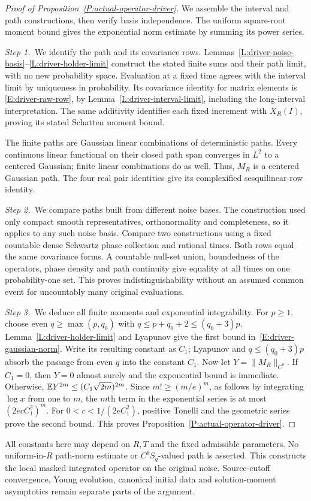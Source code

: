 \begin{proof}[Proof of Proposition~\ref{P:actual-operator-driver}]
  We assemble the interval and path constructions, then verify basis
  independence. The uniform square-root moment bound gives the exponential
  norm estimate by summing its power series.

  \medskip
  \noindent\textit{Step 1.~}We identify the path and its covariance rows.
  Lemmas~\ref{L:driver-noise-basis}--\ref{L:driver-holder-limit} construct the
  stated finite sums and their path limit, with no new probability space.
  Evaluation at a fixed time agrees with the interval limit by uniqueness in
  probability. Its covariance identity for matrix elements is
  \eqref{E:driver-raw-row}, by Lemma~\ref{L:driver-interval-limit}, including
  the long-interval interpretation. The same additivity identifies each fixed
  increment with $X_R(I)$, proving its stated Schatten moment bound.

  The finite paths are Gaussian linear combinations of deterministic paths.
  Every continuous linear functional on their closed path span converges in
  $L^2$ to a centered Gaussian; finite linear combinations do as well. Thus,
  $M_R$ is a centered Gaussian path. The four real pair identities give its
  complexified sesquilinear row identity.

  \medskip
  \noindent\textit{Step 2.~}We compare paths built from different noise bases.
  The construction used only compact smooth representatives, orthonormality and
  completeness, so it applies to any such noise basis. Compare two constructions
  using a fixed countable dense Schwartz phase collection and rational times.
  Both rows equal the same covariance forms. A countable null-set union,
  boundedness of the operators, phase density and path continuity give equality
  at all times on one probability-one set. This proves indistinguishability
  without an assumed common event for uncountably many original evaluations.

  \medskip
  \noindent\textit{Step 3.~}We deduce all finite moments and exponential
  integrability.
  For $p \ge 1$, choose even $q \ge \max(p,q_0)$ with $q \le p+q_0+2 \le
  (q_0+3)p$. Lemma~\ref{L:driver-holder-limit} and Lyapunov give the first bound
  in~\eqref{E:driver-gaussian-norm}. Write its resulting constant as $C_1$;
  Lyapunov and $q \le (q_0+3)p$
  absorb the passage from even $q$ into the constant $C_1$. Now
  let $Y = \|M_R\|_{C^\theta}$. If $C_1 = 0$, then $Y = 0$ almost surely and the
  exponential bound is immediate. Otherwise, $\mathbb{E} Y^{2m} \le
  (C_1\sqrt{2m})^{2m}$. Since $m! \ge (m/e)^m$, as follows by integrating $\log
  x$ from one to $m$, the $m$th term in the exponential series is at most
  $(2ecC_1^2)^m$. For $0 < c < 1/(2eC_1^2)$, positive Tonelli and the geometric
  series prove the second bound. This proves
  Proposition~\ref{P:actual-operator-driver}.
\end{proof}

All constants here may depend on $R,T$ and the fixed admissible parameters. No
uniform-in-$R$ path-norm estimate or $C^\theta S_q$-valued path is asserted.
This constructs the local masked integrated operator on the original noise.
Source-cutoff convergence, Young evolution, canonical initial data and
solution-moment asymptotics remain separate parts of the argument.
